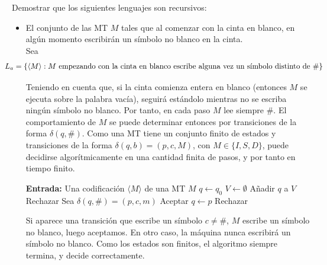
\begin{ejercicio}
    Demostrar que los siguientes lenguajes son recursivos:
    \begin{itemize}
        \item[a)] El conjunto de las MT $M$ tales que al comenzar con la cinta en blanco, en algún momento 
        escribirán un símbolo no blanco en la cinta. \\

        Sea $$\hspace{-1cm}L_a = \{\langle M \rangle : M \text{ empezando con la cinta en blanco escribe alguna vez un símbolo distinto 
        de \#}\}$$

        Teniendo en cuenta que, si la cinta comienza entera en blanco (entonces $M$ se ejecuta sobre la palabra vacía), 
        seguirá estándolo mientras no se escriba ningún símbolo no blanco. Por tanto, 
        en cada paso $M$ lee siempre \#. El comportamiento de $M$ se puede determinar
        entonces por transiciones de la forma $\delta(q,\#)$. Como una MT tiene un conjunto finito de estados 
        y transiciones de la forma $\delta(q,b) = (p, c, M)$, con $M \in \{I,S,D\}$, puede decidirse algorítmicamente
        en una cantidad finita de pasos, y por tanto en tiempo finito.

        \begin{algorithm}
            \caption{MT $M_{L_a}$}
            \begin{algorithmic}
            \State \textbf{Entrada:} Una codificación $\langle M\rangle$ de una MT $M$
            \State $q \gets q_0$
            \State $V \gets \emptyset$
                \State Añadir $q$ a $V$
                    \State Rechazar
                \EndIf
                \State Sea $\delta(q,\#)=(p,c,m)$
                    \State Aceptar
                \EndIf
                \State $q \gets p$
            \EndWhile
            \State Rechazar
            \end{algorithmic}
        \end{algorithm}

        Si aparece una transición que escribe un símbolo $c \neq \#$, $M$ escribe un símbolo no blanco, luego aceptamos.
        En otro caso, la máquina nunca escribirá un símbolo no blanco. Como los estados son finitos, el algoritmo
        siempre termina, y decide correctamente.


\end{itemize}
\end{ejercicio}
